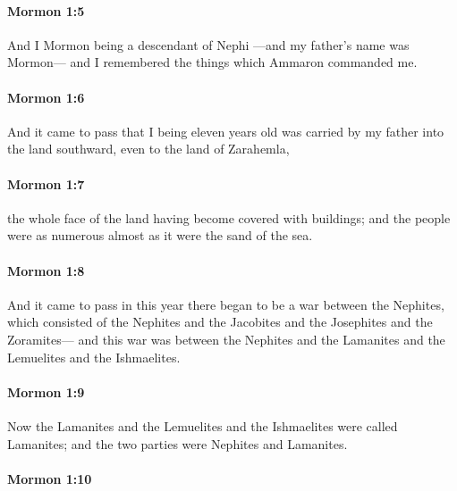 		\paragraph{Mormon 1:5} %
			\label{MORMON-1-5}

			And I Mormon being a descendant of Nephi
			---and my father's name was Mormon---
			and I remembered the things which Ammaron commanded me.

		\paragraph{Mormon 1:6} %
			\label{MORMON-1-6}

			And it came to pass that I being eleven years old
			was carried by my father into the land southward,
			even to the land of Zarahemla,

		\paragraph{Mormon 1:7} %
			\label{MORMON-1-7}

			the whole face of the land having become covered with buildings;
			and the people were as numerous almost as it were the sand of the sea.

		\paragraph{Mormon 1:8} %
			\label{MORMON-1-8}

			And it came to pass in this year there began to be a war between the Nephites,
			which consisted of the Nephites and the Jacobites
			and the Josephites and the Zoramites---
			and this war was between the Nephites and the Lamanites
			and the Lemuelites and the Ishmaelites.

		\paragraph{Mormon 1:9} %
			\label{MORMON-1-9}

			Now the Lamanites and the Lemuelites and the Ishmaelites were called Lamanites;
			and the two parties were Nephites and Lamanites.

		\paragraph{Mormon 1:10} %
			\label{MORMON-1-10}

